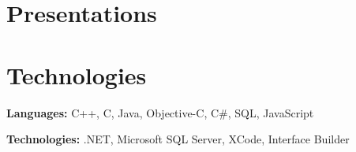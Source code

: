 \documentclass{resume}
\begin{document}
    \section{Presentations}
    
    \section{Technologies}



        
        \begin{onecolentry}
            \textbf{Languages:} C++, C, Java, Objective-C, C\#, SQL, JavaScript
        \end{onecolentry}

        \vspace{0.2 cm}

        \begin{onecolentry}
            \textbf{Technologies:} .NET, Microsoft SQL Server, XCode, Interface Builder
        \end{onecolentry}


    
\end{document}
